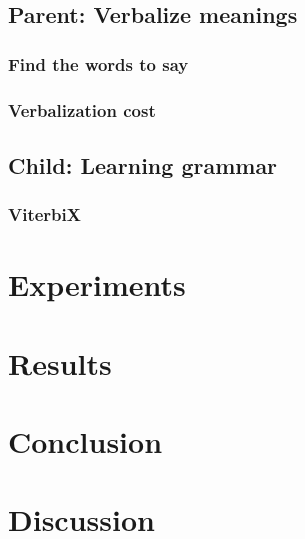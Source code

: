\documentclass[a4paper]{article}
\begin{document}
\subsection{Parent: Verbalize meanings}
\subsubsection{Find the words to say}
\subsubsection{Verbalization cost}
\subsection{Child: Learning grammar} %
\subsubsection{ViterbiX} %
\section{Experiments}
\label{sec:experiments}
\section{Results}
\label{sec:results}
\section{Conclusion}
\label{sec:conclusion}
\section{Discussion}
\label{sec:discussion}



\end{document}
